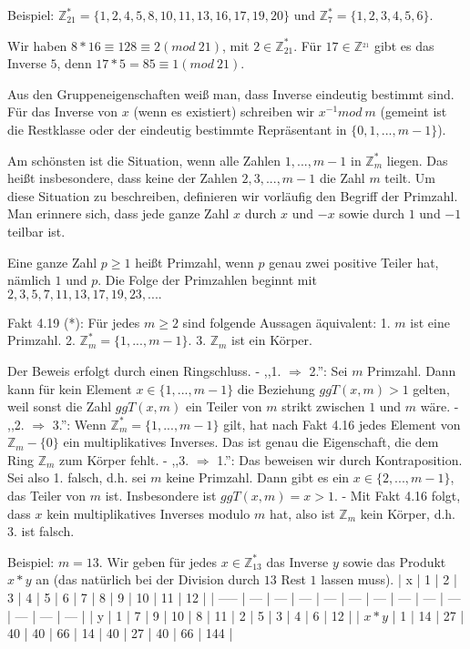 \documentclass[a4paper]{article}
\begin{document}
\begin{multicols}{3}
    Beispiel: $\mathbb{Z}^*_{21}=\{1,2,4,5,8,10,11,13,16,17,19,20\}$ und $\mathbb{Z}^*_7=\{1,2,3,4,5,6\}$.

    Wir haben $8*16 \equiv 128 \equiv 2 (mod\ 21)$, mit $2\in\mathbb{Z}^*_{21}$. Für $17\in\mathbb{Z}^_{21}$ gibt es das Inverse $5$, denn $17*5 = 85\equiv 1 (mod\ 21)$.

    Aus den Gruppeneigenschaften weiß man, dass Inverse eindeutig bestimmt sind. Für das Inverse von $x$ (wenn es existiert) schreiben wir $x^{-1} mod\ m$ (gemeint ist die Restklasse oder der eindeutig bestimmte Repräsentant in $\{0,1 ,...,m-1\}$).

    Am schönsten ist die Situation, wenn alle Zahlen $1,...,m-1$ in $\mathbb{Z}^*_m$ liegen. Das heißt insbesondere, dass keine der Zahlen $2, 3 ,...,m-1$ die Zahl $m$ teilt. Um diese Situation zu beschreiben, definieren wir vorläufig den Begriff der Primzahl. Man erinnere sich, dass jede ganze Zahl $x$ durch $x$ und $-x$ sowie durch $1$ und $-1$ teilbar ist.

    Eine ganze Zahl $p\geq 1$ heißt Primzahl, wenn $p$ genau zwei positive Teiler hat, nämlich $1$ und $p$. Die Folge der Primzahlen beginnt mit $2, 3 , 5 , 7 , 11 , 13 , 17 , 19 , 23 ,....$

    Fakt 4.19 (*): Für jedes $m\geq 2$ sind folgende Aussagen äquivalent:
    1. $m$ ist eine Primzahl.
    2. $\mathbb{Z}^*_m=\{ 1 ,...,m-1\}$.
    3. $\mathbb{Z}_m$ ist ein Körper.

    Der Beweis erfolgt durch einen Ringschluss.
    - ,,1. $\Rightarrow$ 2.'': Sei $m$ Primzahl. Dann kann für kein Element $x\in\{1 ,...,m-1\}$ die Beziehung $ggT(x,m)>1$ gelten, weil sonst die Zahl $ggT(x,m)$ ein Teiler von $m$ strikt zwischen $1$ und $m$ wäre.
    - ,,2. $\Rightarrow$ 3.'': Wenn $\mathbb{Z}^*_m=\{1 ,...,m-1\}$ gilt, hat nach Fakt 4.16 jedes Element von $\mathbb{Z}_m -\{0\}$ ein multiplikatives Inverses. Das ist genau die Eigenschaft, die dem Ring $\mathbb{Z}_m$ zum Körper fehlt.
    - ,,3. $\Rightarrow$ 1.'': Das beweisen wir durch Kontraposition. Sei also 1. falsch, d.h. sei $m$ keine Primzahl. Dann gibt es ein $x\in\{2,...,m-1\}$, das Teiler von $m$ ist. Insbesondere ist $ggT(x,m) =x >1$.
    - Mit Fakt 4.16 folgt, dass $x$ kein multiplikatives Inverses modulo $m$ hat, also ist $\mathbb{Z}_m$ kein Körper, d.h. 3. ist falsch.

    Beispiel: $m=13$. Wir geben für jedes $x\in\mathbb{Z}^*_{13}$ das Inverse $y$ sowie das Produkt $x*y$ an (das natürlich bei der Division durch $13$ Rest $1$ lassen muss).
    | x     | 1   | 2   | 3   | 4   | 5   | 6   | 7   | 8   | 9   | 10  | 11  | 12  |
    | ----- | --- | --- | --- | --- | --- | --- | --- | --- | --- | --- | --- | --- |
    | y     | 1   | 7   | 9   | 10  | 8   | 11  | 2   | 5   | 3   | 4   | 6   | 12  |
    | $x*y$ | 1   | 14  | 27  | 40  | 40  | 66  | 14  | 40  | 27  | 40  | 66  | 144 |


\end{multicols}
\end{document}

